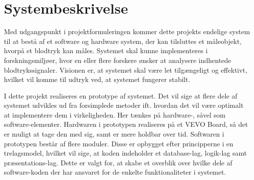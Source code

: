 \chapter{Systembeskrivelse}
Med udgangspunkt i projektformuleringen kommer dette projekts endelige system til at bestå af et software og hardware system, der kan tilsluttes et måleobjekt, hvorpå et blodtryk kan måles. Systemet skal kunne implementeres i forskningsmiljøer, hvor en eller flere forskere ønsker at analysere indhentede blodtrykssignaler. Visionen er, at systemet skal være let tilgængeligt og effektivt, hvilket vil komme til udtryk ved, at systemet fungerer stabilt.

I dette projekt realiseres en prototype af systemet. Det vil sige at flere dele af systemet udvikles ud fra forsimplede metoder ift. hvordan det vil være optimalt at implementere dem i virkeligheden. Her tænkes på hardware-, såvel som software-elementer. Hardwaren i prototypen realiseres på et VEVO Board, så det er muligt at tage den med sig, samt er mere holdbar over tid. Softwaren i prototypen består af flere moduler. Disse er opbygget efter principperne i en trelagsmodel, hvilket vil sige, at koden indeholder et database-lag, logik-lag samt præsentations-lag. Dette er valgt for, at skabe et overblik over hvilke dele af software-koden der har ansvaret for de enkelte funktionaliteter i systemet.

